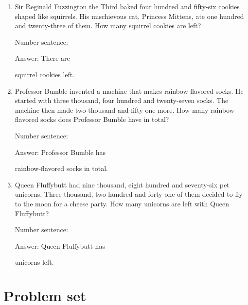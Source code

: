 \documentclass{tufte-book}
\begin{document}
\begin{enumerate}
\item Sir Reginald Fuzzington the Third baked four hundred and fifty-six cookies shaped like squirrels. His mischievous cat, Princess Mittens, ate one hundred and twenty-three of them. How many squirrel cookies are left?

\medskip Number sentence:  \dotfill\medskip

Answer: There are 
\dotfill\medskip\par\mbox{}\dotfill\medskip\par\mbox{}\dotfill\bigskip
squirrel cookies left.

\item Professor Bumble invented a machine that makes rainbow-flavored socks. He started with three thousand, four hundred and twenty-seven socks. The machine then made two thousand and fifty-one more. How many rainbow-flavored socks does Professor Bumble have in total?

\medskip Number sentence: \dotfill\medskip

Answer: Professor Bumble has \dotfill\medskip\par\mbox{}\dotfill\medskip\par\mbox{}\dotfill\bigskip
rainbow-flavored socks in total.

\item Queen Fluffybutt had nine thousand, eight hundred and seventy-six pet unicorns. Three thousand, two hundred and forty-one of them decided to fly to the moon for a cheese party. How many unicorns are left with Queen Fluffybutt?

\medskip Number sentence: \dotfill\medskip

Answer: Queen Fluffybutt has 
\dotfill\medskip\par\mbox{}\dotfill\medskip\par\mbox{}\dotfill\bigskip
unicorns left.

\end{enumerate}

\section{Problem set }
\end{document}
